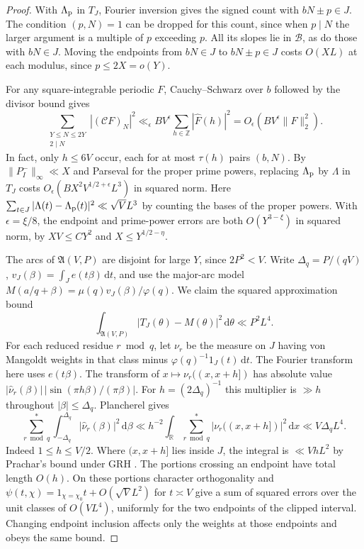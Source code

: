 \documentclass[11pt,a4paper]{article}
\numberwithin{equation}{section}
\newcommand{\ud}{\mathrm d}
\begin{document}
\begin{proof}
With $\Lambda_{\rm p}$ in $T_J$, Fourier inversion gives
the signed count with $bN\pm p\in J$. The condition
$(p,N)=1$ can be dropped for this count, since when $p\mid N$
the larger argument is a multiple of $p$ exceeding $p$.
All its slopes lie in $\mathcal B$, as do those with $bN\in J$.
Moving the endpoints from $bN\in J$ to $bN\pm p\in J$ costs
$O(XL)$ at each modulus, since $p\le2X=o(Y)$.

For any square-integrable periodic $F$, Cauchy--Schwarz over
$b$ followed by the divisor bound gives
\begin{equation}
 \sum_{\substack{Y\le N\le2Y\\2\mid N}} |(\mathcal C F)_N|^2
 \ll_\epsilon B V^\epsilon
    \sum_{h\in\mathbb Z}|\widehat F(h)|^2
 = O_\epsilon(B V^\epsilon\|F\|_2^2).
 \label{eq:criticalgriddualsampling}
\end{equation}
In fact, only $h\le6V$ occur, each for at most $\tau(h)$
pairs $(b,N)$. By $\|P_I^-\|_\infty\ll X$ and Parseval for
the proper prime powers, replacing $\Lambda_{\rm p}$ by
$\Lambda$ in $T_J$ costs $O_\epsilon(B X^2 V^{1/2+\epsilon}L^3)$
in squared norm. Here
$\sum_{t\in J}|\Lambda(t)-\Lambda_{\rm p}(t)|^2\ll\sqrt V L^3$
by counting the bases of the proper powers. With $\epsilon=\xi/8$,
the endpoint and prime-power errors are both $O(Y^{3-\xi})$
in squared norm, by $XV\le CY^2$ and $X\le Y^{1/2-\eta}$.

The arcs of $\mathfrak A(V,P)$ are disjoint for large $Y$,
since $2P^2<V$. Write $\Delta_q=P/(qV)$,
$v_J(\beta)=\int_J e(t\beta)\,\ud t$, and use the major-arc
model $M(a/q+\beta)=\mu(q)v_J(\beta)/\varphi(q)$.
We claim the squared approximation bound
\begin{equation}
 \int_{\mathfrak A(V,P)}|T_J(\theta)-M(\theta)|^2\,\ud\theta
       \ll P^2 L^4 .
 \label{eq:criticalgriddualgrherror}
\end{equation}
For each reduced residue $r\bmod q$, let $\nu_r$ be the
measure on $J$ having von Mangoldt weights in that class
minus $\varphi(q)^{-1}1_J(t)\,\ud t$. The Fourier transform
here uses $e(t\beta)$. The transform of
$x\mapsto\nu_r((x,x+h])$ has absolute value
$|\widehat\nu_r(\beta)|\,|\sin(\pi h\beta)/(\pi\beta)|$.
For $h=(2\Delta_q)^{-1}$ this multiplier is $\gg h$
throughout $|\beta|\le\Delta_q$. Plancherel gives
\[
 \sum_{r\bmod q}^{*}\int_{-\Delta_q}^{\Delta_q}
          |\widehat\nu_r(\beta)|^2\,\ud\beta
 \ll h^{-2}\int_{\mathbb R}\sum_{r\bmod q}^{*}
                        |\nu_r((x,x+h])|^2\,\ud x
 \ll V\Delta_q L^4.
\]
Indeed $1\le h\le V/2$. Where $(x,x+h]$ lies inside $J$,
the integral is $\ll VhL^2$ by Prachar's bound under GRH
\cite{PracharShort,GoldstonYildirimShort}. The portions crossing
an endpoint have total length $O(h)$. On these portions
character orthogonality and
$\psi(t,\chi)=1_{\chi=\chi_0}t+O(\sqrt V L^2)$ for $t\asymp V$
give a sum of squared errors over the unit classes of $O(VL^4)$,
uniformly for the two endpoints of the clipped interval.
Changing endpoint inclusion affects only the weights at those
endpoints and obeys the same bound.


\end{proof}
\end{document}
